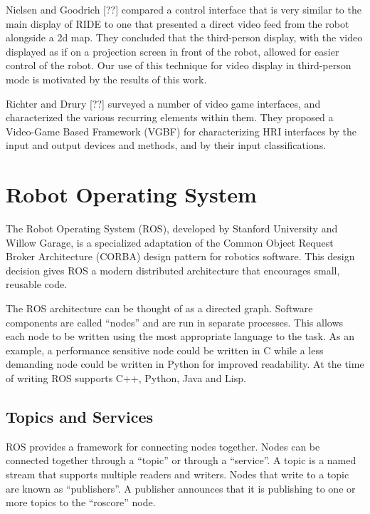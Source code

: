 Nielsen and Goodrich [??] compared a control interface that is very similar to the main display of RIDE to one that presented a direct video feed from the robot alongside a 2d map. They concluded that the third-person display, with the video displayed as if on a projection screen in front of the robot, allowed for easier control of the robot. Our use of this technique for video display in third-person mode is motivated by the results of this work.

Richter and Drury [??] surveyed a number of video game interfaces, and characterized the various recurring elements within them. They proposed a Video-Game Based Framework (VGBF) for characterizing HRI interfaces by the input and output devices and methods, and by their input classifications.


\section{Robot Operating System}
The Robot Operating System (ROS), developed by Stanford University and Willow Garage, is a specialized adaptation of the Common Object Request Broker Architecture (CORBA) design pattern for robotics software. This design decision gives ROS a modern distributed architecture that encourages small, reusable code.

The ROS architecture can be thought of as a directed graph. Software components are called ``nodes'' and are run in separate processes. This allows each node to be written using the most appropriate language to the task. As an example, a performance sensitive node could be written in C while a less demanding node could be written in Python for improved readability. At the time of writing ROS supports C++, Python, Java and Lisp.


\subsection{Topics and Services}
ROS provides a framework for connecting nodes together. Nodes can be connected together through a ``topic'' or through a ``service''. A topic is a named stream that supports multiple readers and writers. Nodes that write to a topic are known as ``publishers''. A publisher announces that it is publishing to one or more topics to the ``roscore'' node. 

